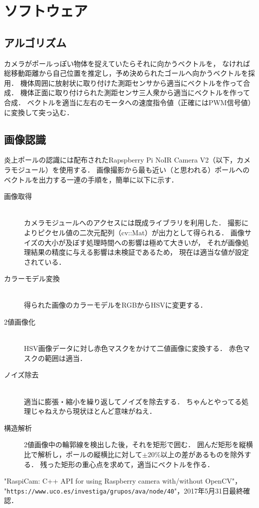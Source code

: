 \documentclass[11pt,a4paper]{jsarticle}
\begin{document}
\section{ソフトウェア} 

\subsection{アルゴリズム}
  カメラがポールっぽい物体を捉えていたらそれに向かうベクトルを，
  なければ総移動距離から自己位置を推定し，予め決められたゴールへ向かうベクトルを採用．
  機体周囲に放射状に取り付けた測距センサから適当にベクトルを作って合成．
  機体正面に取り付けられた測距センサ三人衆から適当にベクトルを作って合成．
  ベクトルを適当に左右のモータへの速度指令値（正確にはPWM信号値）に変換して突っ込む．

\subsection{画像認識}
  炎上ポールの認識には配布されたRapspberry Pi NoIR Camera V2（以下，カメラモジュール）を使用する．
  画像撮影から最も近い（と思われる）ポールへのベクトルを出力する一連の手順を，簡単に以下に示す．

  \begin{description}
    \item[画像取得] \mbox{} \\
      カメラモジュールへのアクセスには既成ライブラリ\cite{raspicam}を利用した．
      撮影によりピクセル値の二次元配列（cv::Mat）が出力として得られる．
      画像サイズの大小が及ぼす処理時間への影響は極めて大きいが，
      それが画像処理結果の精度に与える影響は未検証であるため，
      現在は適当な値が設定されている．\\
    \item[カラーモデル変換] \mbox{} \\
      得られた画像のカラーモデルをRGBからHSVに変更する．\\
    \item[2値画像化] \mbox{} \\
      HSV画像データに対し赤色マスクをかけて二値画像に変換する．
      赤色マスクの範囲は適当．\\
    \item[ノイズ除去] \mbox{} \\
      適当に膨張・縮小を繰り返してノイズを除去する．
      ちゃんとやってる処理じゃねえから現状ほとんど意味がねえ．\\
    \item[構造解析]
      2値画像中の輪郭線を検出した後，それを矩形で囲む．
      囲んだ矩形を縦横比で解析し，ポールの縦横比に対して$\pm 20 \%$以上の差があるものを除外する．
      残った矩形の重心点を求めて，適当にベクトルを作る．\\
  \end{description}



\begin{thebibliography}{9}
   "RaspiCam: C++ API for using Raspberry camera with/without OpenCV"，\\
                     "\texttt{https://www.uco.es/investiga/grupos/ava/node/40}"，2017年5月31日最終確認．
\end{thebibliography}
\end{document}
